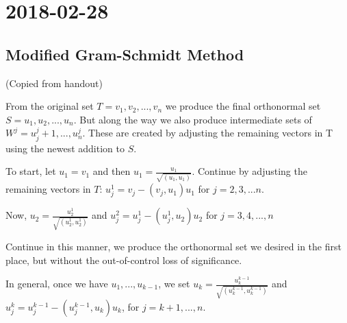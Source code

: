 \section{2018-02-28}

\subsection{Modified Gram-Schmidt Method}

(Copied from handout)

From the original set $T = {v_1, v_2, ..., v_n}$ we produce the final orthonormal set $S = {u_1, u_2, ..., u_n}$. But along the way we also produce intermediate sets of $W^j = {u^j_j+1, ..., u^j_n}$. These are created by adjusting the remaining vectors in T using the newest addition to $S$.

To start, let $u_1 = v_1$ and then $u_1 = \frac{u_1}{\sqrt{(u_1, u_1)}}$. Continue by adjusting the remaining vectors in $T$: $u^1_j = v_j - (v_j, u_1)u_1$ for $j = 2, 3, ... n$.

Now, $u_2 = \frac{u^1_2}{\sqrt{(u^1_2, u^1_2)}}$ and $u^2_j = u^1_j - (u^1_j, u_2)u_2$ for $j = 3, 4, ..., n$

Continue in this manner, we produce the orthonormal set we desired in the first place, but without the out-of-control loss of significance.

In general, once we have ${u_1, ..., u_{k-1}}$, we set $u_k = \frac{u^{k-1}_k}{\sqrt{(u^{k-1}_k, u^{k-1}_k)}}$ and $u^k_j = u^{k-1}_j - (u^{k-1}_j, u_k)u_k$, for $j = k+1, ..., n$.